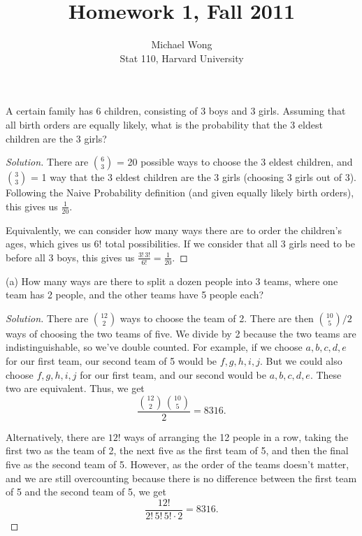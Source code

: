 \documentclass[10pt]{article}
\newenvironment{problem}[2][Problem]{\begin{trivlist}
\item[\hskip \labelsep {\bfseries #1}\hskip \labelsep {\bfseries #2.}]}{\end{trivlist}}
\begin{document}
 
\title{Homework 1, Fall 2011}
\author{Michael Wong\\
Stat 110, Harvard University}
\maketitle

\begin{problem}{1} 
A certain family has 6 children, consisting of 3 boys and 3 girls. Assuming that all birth orders are equally likely, what is the probability that the 3 eldest children are the 3 girls?
\end{problem}

\begin{proof}[Solution]
There are \(\binom{6}{3}\) = 20 possible ways to choose the 3 eldest children, and \(\binom{3}{3}\) = 1 way that the 3 eldest children are the 3 girls (choosing 3 girls out of 3). Following the Naive Probability definition (and given equally likely birth orders), this gives us \(\frac{1}{20}\).

Equivalently, we can consider how many ways there are to order the children's ages, which gives us $6!$ total possibilities. If we consider that all 3 girls need to be before all 3 boys, this gives us \(\frac{3! \, 3!}{6!} = \frac{1}{20}\).
\end{proof}

\begin{problem}{2} 
(a) How many ways are there to split a dozen people into 3 teams, where one team has 2 people, and the other teams have 5 people each?
\end{problem}

\begin{proof}[Solution]
There are \(\binom{12}{2}\) ways to choose the team of 2. There are then \(\binom{10}{5} / 2\) ways of choosing the two teams of five. We divide by 2 because the two teams are indistinguishable, so we've double counted. For example, if we choose $a,b,c,d,e$ for our first team, our second team of 5 would be $f,g,h,i,j$. But we could also choose $f,g,h,i,j$ for our first team, and our second would be $a,b,c,d,e$. These two are equivalent. Thus, we get 
\[
\frac{\binom{12}{2} \, \binom{10}{5}}{2} = 8316.
\]

Alternatively, there are $12!$ ways of arranging the 12 people in a row, taking the first two as the team of 2, the next five as the first team of 5, and then the final five as the second team of 5. However, as the order of the teams doesn't matter, and we are still overcounting because there is no difference between the first team of 5 and the second team of 5, we get
\[
\frac{12!}{2! \,  5! \, 5! \cdot 2} = 8316.
\]
\end{proof}
\end{document}
